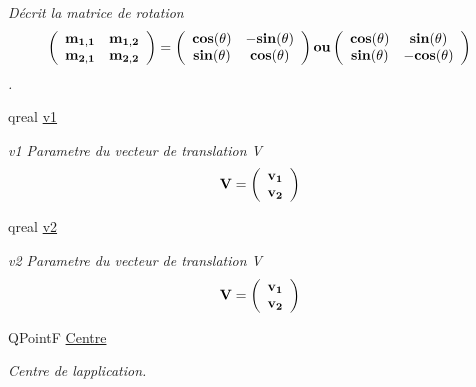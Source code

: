 \begin{DoxyCompactItemize}
\begin{DoxyCompactList}\small\item\em Décrit la matrice de rotation \[ \bf \left( \begin{array}{ccc} \bf m_{1,1} & \bf m_{1,2} \\ \bf m_{2,1} & \bf m_{2,2} \\ \end{array} \bf\right) \bf= \bf\left( \begin{array}{ccc} \bf cos(\bf\theta) & \bf -sin(\bf\theta) \\ \bf sin(\bf\theta) & \bf cos(\bf\theta) \\ \end{array} \bf\right) \bf ou \bf\left( \begin{array}{ccc} \bf cos(\bf\theta) & \bf sin(\bf\theta) \\ \bf sin(\bf\theta) & \bf -cos(\bf\theta) \\ \end{array} \bf\right) \]. \end{DoxyCompactList}\item 
\hypertarget{class_application_aec5855e0925af60f70007a7836883372}{}qreal \hyperlink{class_application_aec5855e0925af60f70007a7836883372}{v1}\label{class_application_aec5855e0925af60f70007a7836883372}

\begin{DoxyCompactList}\small\item\em v1 Parametre du vecteur de translation V \[\bf V\bf= \bf\left( \begin{array}{ccc} \bf v_{1}\\ \bf v_{2}\\ \end{array} \bf\right) \] \end{DoxyCompactList}\item 
\hypertarget{class_application_a4d636adf2cd2c6139f94ddce0fae375b}{}qreal \hyperlink{class_application_a4d636adf2cd2c6139f94ddce0fae375b}{v2}\label{class_application_a4d636adf2cd2c6139f94ddce0fae375b}

\begin{DoxyCompactList}\small\item\em v2 Parametre du vecteur de translation V \[\bf V\bf= \bf\left( \begin{array}{ccc} \bf v_{1}\\ \bf v_{2}\\ \end{array} \bf\right) \] \end{DoxyCompactList}\item 
\hypertarget{class_application_a3974036e3edb906d6a27f23f7514c740}{}Q\+Point\+F \hyperlink{class_application_a3974036e3edb906d6a27f23f7514c740}{Centre}\label{class_application_a3974036e3edb906d6a27f23f7514c740}

\begin{DoxyCompactList}\small\item\em Centre de l\textquotesingle{}application. \end{DoxyCompactList}\end{DoxyCompactItemize}


